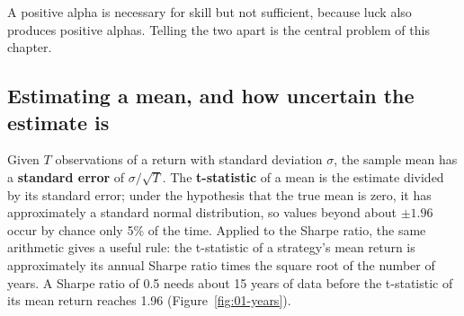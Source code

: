 A positive alpha is necessary for skill but not sufficient, because luck also produces positive alphas. Telling the two apart is the central problem of this chapter.

\subsection{Estimating a mean, and how uncertain the estimate is}

Given $T$ observations of a return with standard deviation $\sigma$, the sample mean has a \textbf{standard error} of $\sigma/\sqrt{T}$. The \textbf{t-statistic} of a mean is the estimate divided by its standard error; under the hypothesis that the true mean is zero, it has approximately a standard normal distribution, so values beyond about $\pm 1.96$ occur by chance only 5\% of the time. Applied to the Sharpe ratio, the same arithmetic gives a useful rule: the t-statistic of a strategy's mean return is approximately its annual Sharpe ratio times the square root of the number of years. A Sharpe ratio of 0.5
needs about 15 years of data before the t-statistic of its mean return reaches 1.96 (Figure~\ref{fig:01-years}).




